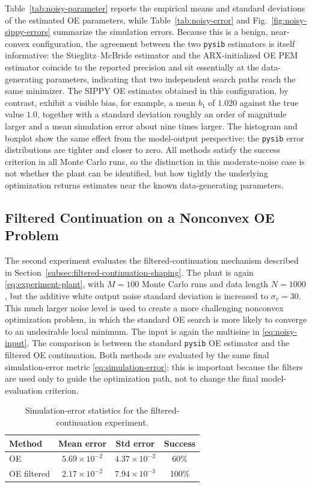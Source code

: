 \documentclass{ifacconf}
\begin{document}
Table~\ref{tab:noisy-parameter} reports the empirical means and standard
deviations of the estimated OE parameters, while Table~\ref{tab:noisy-error}
and Fig.~\ref{fig:noisy-sippy-errors}
summarize the simulation errors.  Because this is a benign, near-convex
configuration, the agreement between the two \texttt{pysib} estimators is itself
informative: the Stieglitz--McBride estimator and the ARX-initialized OE PEM
estimator coincide to the reported precision and sit essentially at the
data-generating parameters, indicating that two independent search paths reach
the same minimizer.  The SIPPY OE estimates obtained in this configuration, by
contrast, exhibit a visible bias, for example, a mean \(b_1\) of \(1.020\)
against the true value \(1.0\), together with a standard deviation roughly an
order of magnitude larger and a mean simulation error about nine times larger.  The
histogram and boxplot show the same effect from the model-output perspective:
the \texttt{pysib} error distributions are tighter and closer to zero.  All
methods satisfy the success criterion in all Monte Carlo runs, so the
distinction in this moderate-noise case is not whether the plant can be
identified, but how tightly the underlying optimization returns estimates near
the known data-generating parameters.

\subsection{Filtered Continuation on a Nonconvex OE Problem}
\label{subsec:filtered-experiment}

The second experiment evaluates the filtered-continuation mechanism described in
Section~\ref{subsec:filtered-continuation-shaping}.  The plant is again
\eqref{eq:experiment-plant}, with \(M=100\) Monte Carlo runs and data length
\(N=1000\), but the additive white output noise standard deviation is increased
to \(\sigma_v=30\).  This much larger noise level is used to create a more
challenging nonconvex optimization problem, in which the standard OE search is
more likely to converge to an undesirable local minimum.  The input is again the
multisine in \eqref{eq:noisy-input}.
The comparison is between the standard \texttt{pysib} OE estimator and the
filtered OE continuation.  Both methods are evaluated by the same final
simulation-error metric \eqref{eq:simulation-error}; this is important because
the filters are used only to guide the optimization path, not to change the
final model-evaluation criterion.

\begin{table}[ht]
  \caption{Simulation-error statistics for the filtered-continuation experiment.}
  \label{tab:filtered-error}
  \centering
  \scriptsize
  \begin{tabular}{lccc}
    \toprule
    Method & Mean error & Std error & Success \\
    \midrule
    OE & \(5.69\times 10^{-2}\) & \(4.37\times 10^{-2}\) & 60\% \\
    OE filtered & \(2.17\times 10^{-2}\) & \(7.94\times 10^{-3}\) & 100\% \\
    \bottomrule
  \end{tabular}
\end{table}
\end{document}

